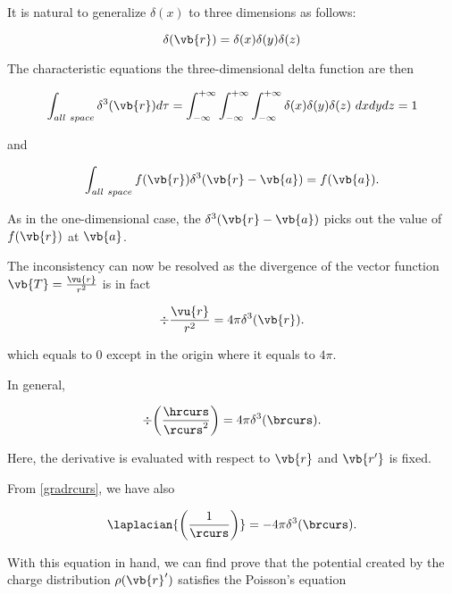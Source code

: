 \documentclass[english,a4paper,12pt]{report}
\begin{document}
It is natural to generalize \(\delta(x)\) to three dimensions as follows:
	
\begin{equation} 
	\delta(\vb{r}) = \delta(x)\delta(y)\delta(z) 
\end{equation}
	
The characteristic equations the three-dimensional delta function are then 
	

\begin{equation} 
	\int_{all~space} \delta^3(\vb{r})
	d\tau = \int_{-\infty}^{+\infty}\int_{-\infty}^{+\infty}\int_{-\infty}^{+\infty} \delta(x)\delta(y)\delta(z) ~dxdydz = 1 
\end{equation}
	
and
	
\begin{equation} 
	\int_{all~space} f(\vb{r}) \delta^3(\vb{r} - \vb{a}) = f(\vb{a}). 
\end{equation} 
	
As in the one-dimensional case, the \(\delta^3(\vb{r} - \vb{a})\) picks out the value of \(f(\vb{r})\) at \(\vb{a}\).
	
The inconsistency can now be resolved as the divergence of the vector function \(\vb{T} = \frac{\vu{r}}{r^2}\) is in fact
	
\begin{equation} 
	\div{\frac{\vu{r}}{r^2}} = 4\pi\delta^3(\vb{r}). 
\end{equation}
	 
which equals to 0 except in the origin where it equals to \(4\pi\).
	
In general,
	
\begin{equation} 
	\div{\left(\frac{\hrcurs}{\rcurs^2}\right)} = 4\pi\delta^3(\brcurs). \label{divdelta} 
\end{equation} 
 	
Here, the derivative is evaluated with respect to \(\vb{r}\) and \(\vb{r'}\) is fixed.
 	
From \cref{gradrcurs}, we have also
 	
\begin{equation} 
	\laplacian{\left(\frac{1}{\rcurs}\right)} = -4\pi\delta^3(\brcurs). \label{laprj} 
\end{equation}

With this equation in hand, we can find prove that the potential created by the charge distribution \(\rho (\vb{r} ')\) satisfies the Poisson's equation 
\end{document}
